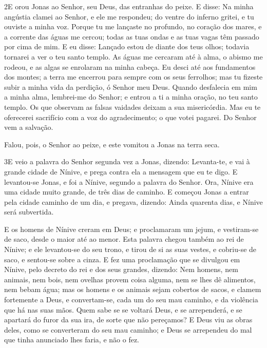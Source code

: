 \medskip

\lettrine{2} E orou Jonas ao Senhor, seu Deus, das entranhas
do peixe. E disse: Na minha angústia clamei ao Senhor, e ele me
respondeu; do ventre do inferno gritei, e tu ouviste a minha voz.
Porque tu me lançaste no profundo, no coração dos mares, e a
corrente das águas me cercou; todas as tuas ondas e as tuas vagas
têm passado por cima de mim. E eu disse: Lançado estou de diante
dos teus olhos; todavia tornarei a ver o teu santo templo. As
águas me cercaram até à alma, o abismo me rodeou, e as algas se
enrolaram na minha cabeça. Eu desci até aos fundamentos dos
montes; a terra me encerrou para sempre com os seus ferrolhos; mas
tu fizeste subir a minha vida da perdição, ó Senhor meu Deus.
Quando desfalecia em mim a minha alma, lembrei-me do Senhor; e
entrou a ti a minha oração, no teu santo templo. Os que observam
as falsas vaidades deixam a sua misericórdia. Mas eu te
oferecerei sacrifício com a voz do agradecimento; o que votei
pagarei. Do Senhor vem a salvação.

Falou, pois, o Senhor ao peixe, e este vomitou a Jonas na terra
seca.

\medskip

\lettrine{3} E veio a palavra do Senhor segunda vez a Jonas,
dizendo: Levanta-te, e vai à grande cidade de Nínive, e prega
contra ela a mensagem que eu te digo. E levantou-se Jonas, e foi
a Nínive, segundo a palavra do Senhor. Ora, Nínive era uma cidade
muito grande, de três dias de caminho. E começou Jonas a entrar
pela cidade caminho de um dia, e pregava, dizendo: Ainda quarenta
dias, e Nínive será subvertida.

E os homens de Nínive creram em Deus; e proclamaram um jejum, e
vestiram-se de saco, desde o maior até ao menor. Esta palavra
chegou também ao rei de Nínive; e ele levantou-se do seu trono, e
tirou de si as suas vestes, e cobriu-se de saco, e sentou-se sobre a
cinza. E fez uma proclamação que se divulgou em Nínive, pelo
decreto do rei e dos seus grandes, dizendo: Nem homens, nem animais,
nem bois, nem ovelhas provem coisa alguma, nem se lhes dê alimentos,
nem bebam água; mas os homens e os animais sejam cobertos de
sacos, e clamem fortemente a Deus, e convertam-se, cada um do seu
mau caminho, e da violência que há nas suas mãos. Quem sabe se
se voltará Deus, e se arrependerá, e se apartará do furor da sua
ira, de sorte que não pereçamos? E Deus viu as obras deles,
como se converteram do seu mau caminho; e Deus se arrependeu do mal
que tinha anunciado lhes faria, e não o fez.

